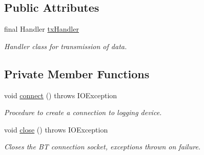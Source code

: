 \subsection*{Public Attributes}
\begin{DoxyCompactItemize}
\item 
final Handler \hyperlink{class_android_app_1_1_b_t_connection_a3236a74297d91f15dd63efc66f03a821}{tx\+Handler}
\begin{DoxyCompactList}\small\item\em Handler class for transmission of data. \end{DoxyCompactList}\end{DoxyCompactItemize}
\subsection*{Private Member Functions}
\begin{DoxyCompactItemize}
\item 
void \hyperlink{class_android_app_1_1_b_t_connection_a1dfc9451ba1b40089f17ee081486602e}{connect} ()  throws I\+O\+Exception 
\begin{DoxyCompactList}\small\item\em Procedure to create a connection to logging device. \end{DoxyCompactList}\item 
\mbox{\label{class_android_app_1_1_b_t_connection_a37bb3e5c1dcf6b78a73239f6f62ab6d8}} 
void \hyperlink{class_android_app_1_1_b_t_connection_a37bb3e5c1dcf6b78a73239f6f62ab6d8}{close} ()  throws I\+O\+Exception 
\begin{DoxyCompactList}\small\item\em Closes the BT connection socket, exceptions thrown on failure. \end{DoxyCompactList}\end{DoxyCompactItemize}
